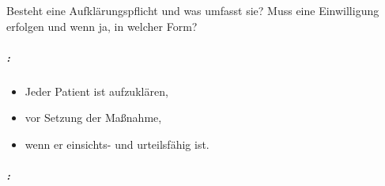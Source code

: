 Besteht eine Aufklärungspflicht und was umfasst sie? Muss eine
Einwilligung erfolgen und wenn ja, in welcher Form?


\subparagraph*{:}

\begin{itemize}
    \item Jeder Patient ist aufzuklären,
    \item vor Setzung der Ma{\ss}nahme,
    \item wenn er einsichts- und urteilsfähig ist.
\end{itemize}


\subparagraph{:}

